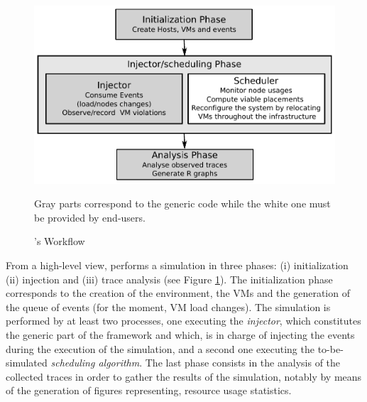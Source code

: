 \begin{figure}
\centering
\vspace*{-.6cm}
\includegraphics[width=.99\linewidth]{figures/VMPlaceS-workflow.pdf}
\vspace*{-.5cm}
\caption{\vmps's Workflow}
\flushleft \scriptsize{Gray parts correspond to the generic code while the white one
  must be provided by end-users. %
}
\vspace*{-.8cm}
\label{fig:workflow}
\end{figure}
%
From a high-level view, \vmps performs a simulation in three phases:
(i) initialization (ii) injection and (iii) trace analysis (see Figure
\ref{fig:workflow}).  The initialization phase corresponds to the
creation of the environment, the VMs and the generation of the queue
of events (for the moment, VM load changes).
%
The
simulation is performed by at least two \sg processes, one executing
the \emph{injector}, which constitutes the generic part of the
framework and which, is in charge of injecting the events during the
execution of the simulation, and a second one executing the to-be-simulated
\emph{scheduling algorithm}.
%
The last phase consists in the analysis of the collected traces in
order to gather the results of the simulation, notably by means of the
generation of figures representing, \eg resource usage statistics.

